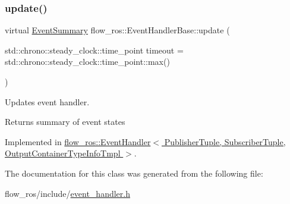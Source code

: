 \subsubsection{\texorpdfstring{update()}{update()}}
{\footnotesize\ttfamily virtual \hyperlink{structflow__ros_1_1_event_summary}{Event\+Summary} flow\+\_\+ros\+::\+Event\+Handler\+Base\+::update (\begin{DoxyParamCaption}\item[{std\+::chrono\+::steady\+\_\+clock\+::time\+\_\+point}]{timeout = {\ttfamily std\+:\+:chrono\+:\+:steady\+\_\+clock\+:\+:time\+\_\+point\+:\+:max()} }\end{DoxyParamCaption})\hspace{0.3cm}{\ttfamily [pure virtual]}}



Updates event handler. 

\begin{DoxyReturn}{Returns}
summary of event states 
\end{DoxyReturn}


Implemented in \hyperlink{classflow__ros_1_1_event_handler_a445ecc20268a455bf47df8598413ae67}{flow\+\_\+ros\+::\+Event\+Handler$<$ Publisher\+Tuple, Subscriber\+Tuple, Output\+Container\+Type\+Info\+Tmpl $>$}.



The documentation for this class was generated from the following file\+:\begin{DoxyCompactItemize}
\item 
flow\+\_\+ros/include/\hyperlink{event__handler_8h}{event\+\_\+handler.\+h}\end{DoxyCompactItemize}
